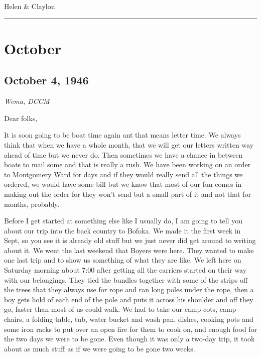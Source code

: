 \documentclass[
]{book}
\begin{document}
Helen \& Claylon

\begin{center}\rule{0.5\linewidth}{0.5pt}\end{center}

\hypertarget{october}{%
\section{October}\label{october}}

\hypertarget{october-4-1946}{%
\subsection{October 4, 1946}\label{october-4-1946}}

\emph{Wema, DCCM}

Dear folks,

It is soon going to be boat time again ant that means letter time. We always think that when we have a whole month, that we will get our letters written way ahead of time but we never do. Then sometimes we have a chance in between boats to mail some and that is really a rush. We have been working on an order to Montgomery Ward for days and if they would really send all the things we ordered, we would have some bill but we know that most of our fun comes in making out the order for they won't send but a small part of it and not that for months, probably.

Before I get started at something else like I usually do, I am going to tell you about our trip into the back country to Bofoka. We made it the first week in Sept, so you see it is already old stuff but we just never did get around to writing about it. We went the last weekend that Boyers were here. They wanted to make one last trip and to show us something of what they are like. We left here on Saturday morning about 7:00 after getting all the carriers started on their way with our belongings. They tied the bundles together with some of the strips off the trees that they always use for rope and ran long poles under the rope, then a boy gets hold of each end of the pole and puts it across his shoulder and off they go, faster than most of us could walk. We had to take our camp cots, camp chairs, a folding table, tub, water bucket and wash pan, dishes, cooking pots and some iron racks to put over an open fire for them to cook on, and enough food for the two days we were to be gone. Even though it was only a two-day trip, it took about as much stuff as if we were going to be gone two weeks.
\end{document}
